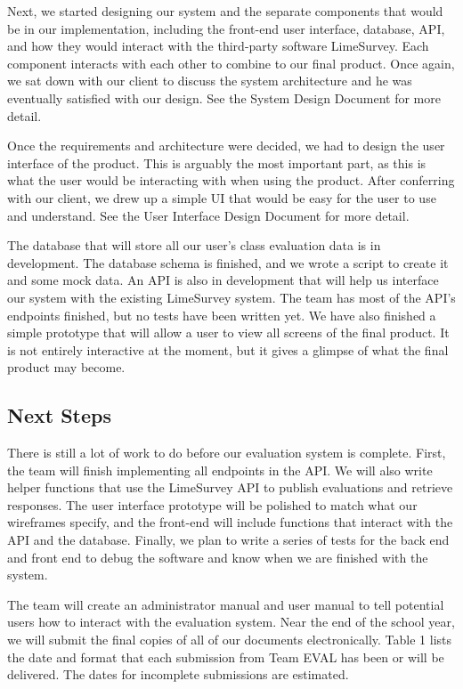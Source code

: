 \documentclass{article}
\begin{document}
Next, we started designing our system and the separate components that would be in our implementation, including the front-end user interface, database, API, and how they would interact with the third-party software LimeSurvey. Each component interacts with each other to combine to our final product. Once again, we sat down with our client to discuss the system architecture and he was eventually satisfied with our design. See the System Design Document for more detail.

Once the requirements and architecture were decided, we had to design the user interface of the product. This is arguably the most important part, as this is what the user would be interacting with when using the product. After conferring with our client, we drew up a simple UI that would be easy for the user to use and understand. See the User Interface Design Document for more detail.

The database that will store all our user's class evaluation data is in development. The database schema is finished, and we wrote a script to create it and some mock data. An API is also in development that will help us interface our system with the existing LimeSurvey system. The team has most of the API's endpoints finished, but no tests have been written yet. We have also finished a simple prototype that will allow a user to view all screens of the final product. It is not entirely interactive at the moment, but it gives a glimpse of what the final product may become.

\subsection{Next Steps}

There is still a lot of work to do before our evaluation system is complete. First, the team will finish implementing all endpoints in the API. We will also write helper functions that use the LimeSurvey API to publish evaluations and retrieve responses. The user interface prototype will be polished to match what our wireframes specify, and the front-end will include functions that interact with the API and the database. Finally, we plan to write a series of tests for the back end and front end to debug the software and know when we are finished with the system.

The team will create an administrator manual and user manual to tell potential users how to interact with the evaluation system. Near the end of the school year, we will submit the final copies of all of our documents electronically. Table 1 lists the date and format that each submission from Team EVAL has been or will be delivered. The dates for incomplete submissions are estimated.
\end{document}
